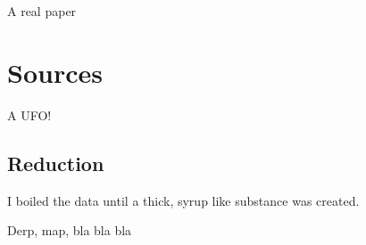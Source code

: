 A real paper \citep{Hatchell02}

\section{Sources}

A UFO!


\subsection{Reduction}

I boiled the data until a thick, syrup like substance was created.

\newpage

Derp, map, bla bla bla
